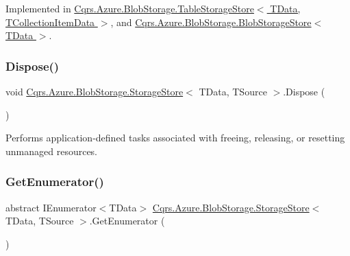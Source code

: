 Implemented in \hyperlink{classCqrs_1_1Azure_1_1BlobStorage_1_1TableStorageStore_a1ad02e710a3fe1d794d99db332c351dc_a1ad02e710a3fe1d794d99db332c351dc}{Cqrs.\+Azure.\+Blob\+Storage.\+Table\+Storage\+Store$<$ T\+Data, T\+Collection\+Item\+Data $>$}, and \hyperlink{classCqrs_1_1Azure_1_1BlobStorage_1_1BlobStorageStore_a7e4870567b393327563d131cb25151e0_a7e4870567b393327563d131cb25151e0}{Cqrs.\+Azure.\+Blob\+Storage.\+Blob\+Storage\+Store$<$ T\+Data $>$}.

\mbox{\label{classCqrs_1_1Azure_1_1BlobStorage_1_1StorageStore_a3fddffcffd2bd3c79212bb6ef2cdc422_a3fddffcffd2bd3c79212bb6ef2cdc422}} 
\subsubsection{\texorpdfstring{Dispose()}{Dispose()}}
{\footnotesize\ttfamily void \hyperlink{classCqrs_1_1Azure_1_1BlobStorage_1_1StorageStore}{Cqrs.\+Azure.\+Blob\+Storage.\+Storage\+Store}$<$ T\+Data, T\+Source $>$.Dispose (\begin{DoxyParamCaption}{ }\end{DoxyParamCaption})}



Performs application-\/defined tasks associated with freeing, releasing, or resetting unmanaged resources. 

\mbox{\label{classCqrs_1_1Azure_1_1BlobStorage_1_1StorageStore_a2eb689ea51d586309b79d6cbac05b616_a2eb689ea51d586309b79d6cbac05b616}} 
\subsubsection{\texorpdfstring{Get\+Enumerator()}{GetEnumerator()}}
{\footnotesize\ttfamily abstract I\+Enumerator$<$T\+Data$>$ \hyperlink{classCqrs_1_1Azure_1_1BlobStorage_1_1StorageStore}{Cqrs.\+Azure.\+Blob\+Storage.\+Storage\+Store}$<$ T\+Data, T\+Source $>$.Get\+Enumerator (\begin{DoxyParamCaption}{ }\end{DoxyParamCaption})\hspace{0.3cm}{\ttfamily [pure virtual]}}



